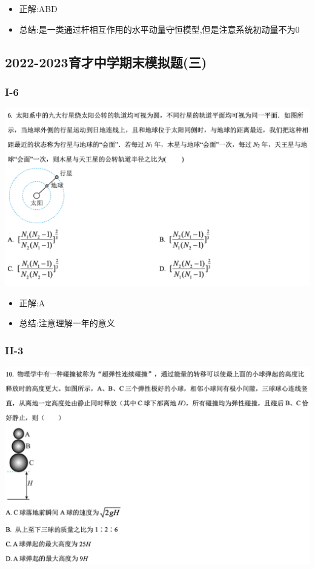 \documentclass{article}
\begin{document}
        \begin{itemize}
            \item 正解:\quad ABD
            \item 总结:\quad 是一类通过杆相互作用的水平动量守恒模型,但是注意系统初动量不为0
        \end{itemize}


        \subsection{2022-2023育才中学期末模拟题(三)}
        \subsubsection{I-6}

        \includegraphics[width=50em,keepaspectratio]{./pictures/1.3-15.png}

        \begin{itemize}
            \item 正解:\quad A
            \item 总结:\quad 注意理解一年的意义
        \end{itemize}

        \subsubsection{II-3}

        \includegraphics[width=50em,keepaspectratio]{./pictures/1.3-16.png}
\end{document}
